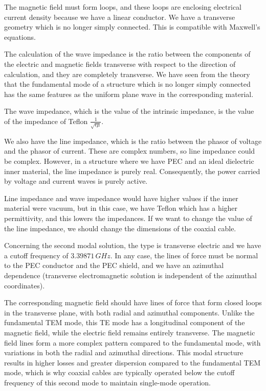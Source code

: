 \documentclass{article}
\begin{document}
The magnetic field must form loops, and these loops are enclosing electrical current density because we have a linear conductor. We have a transverse geometry which is no longer simply connected. This is compatible with Maxwell's equations.

The calculation of the wave impedance is the ratio between the components of the electric and magnetic fields transverse with respect to the direction of calculation, and they are completely transverse. We have seen from the theory that the fundamental mode of a structure which is no longer simply connected has the same features as the uniform plane wave in the corresponding material.

The wave impedance, which is the value of the intrinsic impedance, is the value of the impedance of Teflon $\frac{1}{\sqrt{\epsilon \mu}}$.

We also have the line impedance, which is the ratio between the phasor of voltage and the phasor of current. These are complex numbers, so line impedance could be complex. However, in a structure where we have PEC and an ideal dielectric inner material, the line impedance is purely real. Consequently, the power carried by voltage and current waves is purely active.

Line impedance and wave impedance would have higher values if the inner material were vacuum, but in this case, we have Teflon which has a higher permittivity, and this lowers the impedances. If we want to change the value of the line impedance, we should change the dimensions of the coaxial cable.

Concerning the second modal solution, the type is transverse electric and we have a cutoff frequency of $3.39871\,GHz$. In any case, the lines of force must be normal to the PEC conductor and the PEC shield, and we have an azimuthal dependence (transverse electromagnetic solution is independent of the azimuthal coordinates).

The corresponding magnetic field should have lines of force that form closed loops in the transverse plane, with both radial and azimuthal components. Unlike the fundamental TEM mode, this TE mode has a longitudinal component of the magnetic field, while the electric field remains entirely transverse. The magnetic field lines form a more complex pattern compared to the fundamental mode, with variations in both the radial and azimuthal directions. This modal structure results in higher losses and greater dispersion compared to the fundamental TEM mode, which is why coaxial cables are typically operated below the cutoff frequency of this second mode to maintain single-mode operation.
\end{document}
